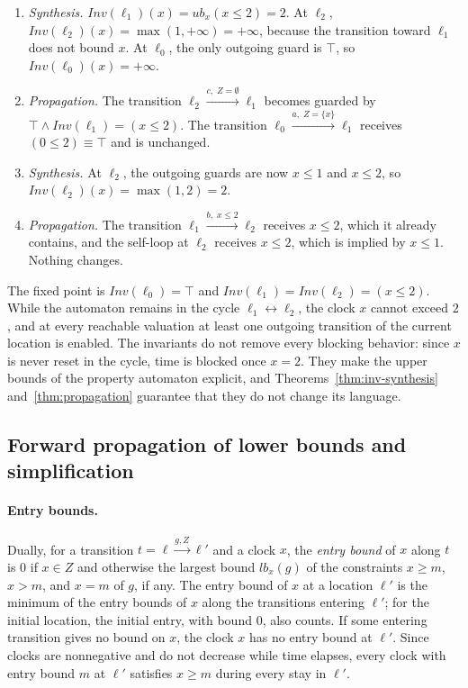 \begin{enumerate}
\item \emph{Synthesis.}  $\mathit{Inv}(\ell_1)(x)=\mathit{ub}_x(x\le2)=2$.  At
$\ell_2$, $\mathit{Inv}(\ell_2)(x)=\max(1,+\infty)=+\infty$, because the
transition toward $\ell_1$ does not bound $x$.  At $\ell_0$, the only outgoing
guard is $\top$, so $\mathit{Inv}(\ell_0)(x)=+\infty$.

\item \emph{Propagation.}  The transition
$\ell_2\xrightarrow{c,\;Z=\emptyset}\ell_1$ becomes guarded by
$\top\wedge\mathit{Inv}(\ell_1)=(x\le2)$.  The transition
$\ell_0\xrightarrow{a,\;Z=\{x\}}\ell_1$ receives $(0\le2)\equiv\top$ and is
unchanged.

\item \emph{Synthesis.}  At $\ell_2$, the outgoing guards are now $x\le1$ and
$x\le2$, so $\mathit{Inv}(\ell_2)(x)=\max(1,2)=2$.

\item \emph{Propagation.}  The transition $\ell_1\xrightarrow{b,\;x\le2}\ell_2$
receives $x\le2$, which it already contains, and the self-loop at $\ell_2$
receives $x\le2$, which is implied by $x\le1$.  Nothing changes.
\end{enumerate}
The fixed point is $\mathit{Inv}(\ell_0)=\top$ and
$\mathit{Inv}(\ell_1)=\mathit{Inv}(\ell_2)=(x\le2)$.  While the automaton
remains in the cycle $\ell_1\leftrightarrow\ell_2$, the clock $x$ cannot exceed
$2$, and at every reachable valuation at least one outgoing transition of the
current location is enabled.  The invariants do not remove every blocking
behavior: since $x$ is never reset in the cycle, time is blocked once $x=2$.
They make the upper bounds of the property automaton explicit, and
Theorems~\ref{thm:inv-synthesis} and~\ref{thm:propagation} guarantee that they
do not change its language.

\subsection{Forward propagation of lower bounds and simplification}
\label{sec:forward}\label{sec:main-forward}
\paragraph{Entry bounds.}
Dually, for a transition $t=\ell\xrightarrow{g,Z}\ell'$ and a clock $x$, the
\emph{entry bound} of $x$ along $t$ is $0$ if $x\in Z$ and otherwise the
largest bound $\mathit{lb}_x(g)$ of the constraints $x\ge m$, $x>m$, and $x=m$
of $g$, if any.  The entry bound of $x$ at a location $\ell'$ is the minimum of
the entry bounds of $x$ along the transitions entering $\ell'$; for the initial
location, the initial entry, with bound $0$, also counts.  If some entering
transition gives no bound on $x$, the clock $x$ has no entry bound at $\ell'$.
Since clocks are nonnegative and do not decrease while time elapses, every
clock with entry bound $m$ at $\ell'$ satisfies $x\ge m$ during every stay in
$\ell'$.

